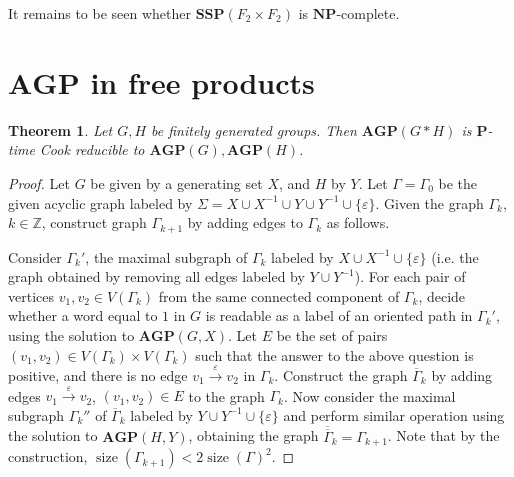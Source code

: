 \documentclass[10pt]{amsart}
\newtheorem{theorem}{Theorem}[section]
\theoremstyle{definition}
\DeclareMathOperator{\size}{{size}}
\def\P{{\mathbf{P}}}
\def\NP{{\mathbf{NP}}}
\def\SSP{{\mathbf{SSP}}}
\def\AGP{{\mathbf{AGP}}}
\begin{document}
It remains to be seen whether $\SSP(F_2\times F_2)$ is $\NP$-complete.

\section{$\AGP$ in free products}\label{sec:free_prod}
\begin{theorem}\label{th:agp_to_factors}
Let $G,H$ be finitely generated groups. Then $\AGP(G*H)$ is $\P$-time Cook reducible to $\AGP(G),\AGP(H)$.
\end{theorem}
\begin{proof}
Let $G$ be given by a generating set $X$, and $H$ by $Y$. Let $\Gamma=\Gamma_0$ be the given acyclic graph labeled by $\Sigma=X\cup X^{-1}\cup Y\cup Y^{-1}\cup\{\varepsilon\}$. Given the graph $\Gamma_k$, $k\in\mathbb Z$, construct graph $\Gamma_{k+1}$ by adding edges to $\Gamma_k$ as follows.

Consider $\Gamma_{k}'$, the maximal subgraph of $\Gamma_k$ labeled by  $X\cup X^{-1}\cup \{\varepsilon\}$ (i.e. the graph obtained by removing all edges labeled by $Y\cup Y^{-1}$).
For each pair of vertices $v_1,v_2\in V(\Gamma_k)$ from the same connected component of $\Gamma_k$, decide whether a word equal to $1$ in $G$ is readable as a label of an oriented path in $\Gamma_k'$, using the solution to $\AGP(G,X)$.
Let $E$ be the set of pairs $(v_1,v_2)\in V(\Gamma_k)\times V(\Gamma_k)$ such that the answer to the above question is positive, and there is no edge $v_1\overset{\varepsilon}{\to}v_2$ in $\Gamma_k.$ Construct the graph $\overline{\Gamma}_k$ by adding edges  $v_1\overset{\varepsilon}{\to}v_2$, $(v_1,v_2)\in E$ to the graph $\Gamma_k$.
Now consider the maximal subgraph $\Gamma_k''$ of $\overline{\Gamma}_k$ labeled by $Y\cup Y^{-1}\cup \{\varepsilon\}$ and perform similar operation using the solution to $\AGP(H,Y)$, obtaining the graph $\overline{\overline{\Gamma}}_k=\Gamma_{k+1}$.
Note that by the construction, $\size(\Gamma_{k+1})<2\size(\Gamma)^2$.


\end{proof}
\end{document}
